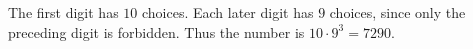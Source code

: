 The first digit has $10$ choices. Each later digit has $9$ choices, since only the preceding digit is forbidden. Thus the number is $\boxed{10\cdot9^3=7290}$.
